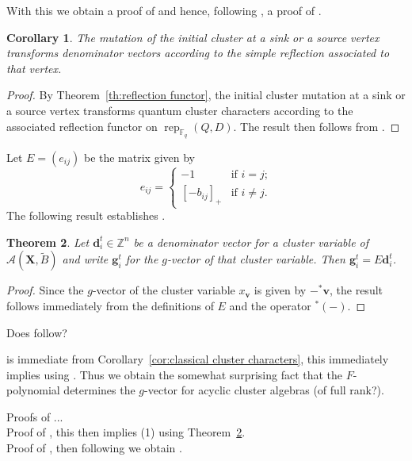 \documentclass{amsart}
\newtheorem{theorem}{Theorem}
\newtheorem{corollary}[theorem]{Corollary}
\newcommand{\bfd}{\mathbf{d}}
\newcommand{\bfg}{\mathbf{g}}
\newcommand{\bfv}{\mathbf{v}}
\newcommand{\bfX}{\mathbf{X}}
\newcommand{\cA}{\mathcal{A}}
\newcommand{\FF}{\mathbb{F}}
\newcommand{\rep}{\operatorname{rep}}
\newcommand{\ZZ}{\mathbb{Z}}
\begin{document}
  With this we obtain a proof of \cite[Conj. 1.8]{reading-stella} and hence, following \cite[Prop. 1.10]{reading-stella}, a proof of \cite[Conj. 1.7]{reading-stella}.
  \begin{corollary}
    The mutation of the initial cluster at a sink or a source vertex transforms denominator vectors according to the simple reflection associated to that vertex.
  \end{corollary}
  \begin{proof}
    By Theorem~\ref{th:reflection functor}, the initial cluster mutation at a sink or a source vertex transforms quantum cluster characters according to the associated reflection functor on $\rep_{\FF_q}(Q,D)$.  The result then follows from \cite[Prop. 2.1]{dlab-ringel}.
  \end{proof}

  Let $E=(e_{ij})$ be the matrix given by
  \[e_{ij}=\begin{cases} -1 & \text{if $i=j$;}\\ [-b_{ij}]_+ & \text{if $i\ne j$.}\end{cases}\]
  The following result establishes \cite[Conj. 3.21]{reading-speyer}.
  \begin{theorem}\label{th:d to g}
    Let $\bfd_i^t\in\ZZ^n$ be a denominator vector for a cluster variable of $\cA(\bfX,\tilde B)$ and write $\bfg_i^t$ for the $g$-vector of that cluster variable.  Then $\bfg_i^t=E\bfd_i^t$.
  \end{theorem}
  \begin{proof}
    Since the $g$-vector of the cluster variable $x_\bfv$ is given by $-{}^*\bfv$, the result follows immediately from the definitions of $E$ and the operator ${}^*(-)$.
  \end{proof}
  Does \cite[Conj. 6.13]{FZ} follow?

  \cite[Conj. 7.17]{FZ} is immediate from Corollary~\ref{cor:classical cluster characters}, this immediately implies \cite[Conj. 6.11]{FZ} using \cite[Prop. 7.16]{FZ}.  Thus we obtain the somewhat surprising fact that the $F$-polynomial determines the $g$-vector for acyclic cluster algebras (of full rank?).

  Proofs of \cite[Conj. 5.4 and 5.5]{FZ}...\\
  Proof of \cite[Con. 7.6]{FZ}, this then implies \cite[Conj. 7.10]{FZ}(1) using Theorem~\ref{th:d to g}.\\
  Proof of \cite[Conj. 7.10]{FZ}, then following \cite[Rem. 7.11]{FZ} we obtain \cite[Con. 7.2]{FZ}.
  
\end{document}
